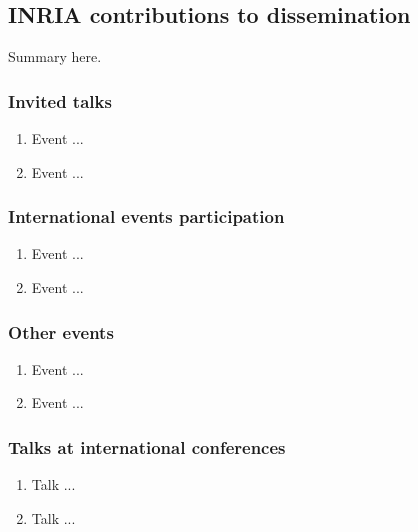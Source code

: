 \subsection{INRIA contributions to dissemination}

Summary here.

\subsubsection{Invited talks}

\begin{enumerate}
\item  Event ...

\item  Event ...
\end{enumerate}

\subsubsection{International events participation}

\begin{enumerate}

\item  Event ...

\item  Event ...

\end{enumerate}

\subsubsection{Other events}

\begin{enumerate}

\item  Event ...

\item  Event ...

\end{enumerate}

\subsubsection{Talks at international conferences}

\begin{enumerate}
\item  Talk ...

\item  Talk ...
\end{enumerate}


